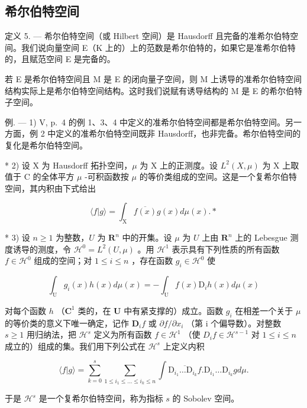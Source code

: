 \subsection{希尔伯特空间}

定义 5. --- 希尔伯特空间（或 Hilbert 空间）是 Hausdorff 且完备的准希尔伯特空间。我们说向量空间 E（K 上的）上的范数是希尔伯特的，如果它是准希尔伯特的，且赋范空间 E 是完备的。

若 E 是希尔伯特空间且 M 是 E 的闭向量子空间，则 M 上诱导的准希尔伯特空间结构实际上是希尔伯特空间结构。这时我们说赋有诱导结构的 M 是 E 的希尔伯特子空间。

例. --- 1) V, p.~4 的例 1、3、4 中定义的准希尔伯特空间都是希尔伯特空间。另一方面，例 2 中定义的准希尔伯特空间既非 Hausdorff，也非完备。希尔伯特空间的复化是希尔伯特空间。

* 2) 设 X 为 Hausdorff 拓扑空间，\(\mu\) 为 X 上的正测度。设 \(L^2(X, \mu)\) 为 X 上取值于 C 的全体平方 \(\mu\) -可积函数按 \(\mu\) 的等价类组成的空间。这是一个复希尔伯特空间，其内积由下式给出

\[
\langle f | g \rangle = \int_ {\mathrm{X}} \overline {{{f (x)}}} g (x) d \mu (x). *
\]

* 3) 设 \(n \geqslant 1\) 为整数，\(U\) 为 \(\mathbf{R}^n\) 中的开集。设 \(\mu\) 为 \(U\) 上由 \(\mathbf{R}^n\) 上的 Lebesgue 测度诱导的测度，令 \(\mathcal{H}^0 = L^2(U, \mu)\) 。用 \(\mathcal{H}^1\) 表示具有下列性质的所有函数 \(f \in \mathcal{H}^0\) 组成的空间；对 \(1 \leqslant i \leqslant n\) ，存在函数 \(g_i \in \mathcal{H}^0\) 使

\[
\int_ {\mathrm{U}} g _ {i} (x) h (x) d \mu (x) = - \int_ {\mathrm{U}} f (x) \mathrm{D} _ {i} h (x) d \mu (x)
\]

对每个函数 \(h\) （\(\mathbf{C}^1\) 类的，在 \(\mathbf{U}\) 中有紧支撑的）成立。函数 \(g_i\) 在相差一个关于 \(\mu\) 的等价类的意义下唯一确定，记作 \(\mathbf{D}_i f\) 或 \(\partial f / \partial x_i\) （第 i 个偏导数）。对整数 \(s \geqslant 1\) 用归纳法，把 \(\mathcal{H}^s\) 定义为所有函数 \(f \in \mathcal{H}^1\) （使 \(D_i f \in \mathcal{H}^{s-1}\) 对 \(1 \leqslant i \leqslant n\) 成立的）组成的集。我们用下列公式在 \(\mathcal{H}^s\) 上定义内积

\[
\langle f | g \rangle = \sum_ {k = 0} ^ {s} \sum_ {1 \leqslant i _ {1} \leqslant \dots \leqslant i _ {k} \leqslant n} \int \overline {{{{\mathrm{D} _ {i _ {1}} \dots \mathrm{D} _ {i _ {k}} f}}}}. \mathrm{D} _ {i _ {1}} \dots \mathrm{D} _ {i _ {k}} g d \mu .
\]

于是 \(\mathcal{H}^s\) 是一个复希尔伯特空间，称为指标 \(s\) 的 Sobolev 空间。

